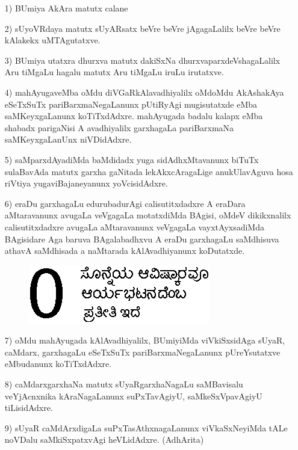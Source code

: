 \begin{itemize}
\item[{\rm 1)}] BUmiya AkAra matutx calane
  
\item[{\rm 2)}] sUyoVRdaya matutx sUyARsatx beVre beVre jAgagaLalilx beVre beVre kAlakekx uMTAgutatxve.
  
\item[{\rm 3)}] BUmiya utatxra dhurxva matutx dakiSxNa dhurxvaparxdeVshagaLalilx Aru tiMgaLu hagalu matutx Aru tiMgaLu iruLu irutatxve.

\item[{\rm 4)}] mahAyugaveMba oMdu diVGaRkAlavadhiyalilx oMdoMdu AkAshakAya eSeTxSuTx pariBarxmaNegaLanunx pUtiRyAgi mugisutatxde eMba saMKeyxgaLanunx koTiTxdAdxre. mahAyugada badalu kalapx eMba shabadx parigaNisi A avadhiyalilx garxhagaLa pariBarxmaNa saMKeyxgaLanUnx niVDidAdxre. 

\item[{\rm 5)}] saMparxdAyadiMda baMdidadx yuga sidAdhxMtavanunx biTuTx sulaBavAda matutx garxha gaNitada lekAkxcAragaLige anukUlavAguva hosa riVtiya yugaviBajaneyanunx yoVcisidAdxre. 

\item[{\rm 6)}] eraDu garxhagaLu edurubadurAgi calisutitxdadxre A eraDara aMtaravanunx avugaLa veVgagaLa motatxdiMda BAgisi, oMdeV dikikxnalilx calisutitxdadxre avugaLa aMtaravanunx veVgagaLa vayxtAyxsadiMda BAgisidare Aga baruva BAgalabadhxvu A eraDu garxhagaLu saMdhisuva athavA saMdhisada a naMtarada kAlAvadhiyanunx koDutatxde.
\begin{figure}[H]
\centering
\includegraphics[scale=0.8]{src/figures/fig17.eps}
\end{figure}
   
  
\item[{\rm 7)}] oMdu mahAyugada kAlAvadhiyalilx, BUmiyiMda viVkiSxsidAga sUyaR, caMdarx, garxhagaLu eSeTxSuTx pariBarxmaNegaLanunx pUreYsutatxve eMbudanunx koTiTxdAdxre. 

\eject

\item[{\rm 8)}] caMdarxgarxhaNa matutx sUyaRgarxhaNagaLu saMBavisalu veYjAcnxnika kAraNa\-gaLanunx suPxTavAgiyU, saMkeSxVpavAgiyU tiLisidAdxre. 
  
\item[{\rm 9)}] sUyaR caMdArxdigaLa suPxTasAthxnagaLanunx viVkaSxNeyiMda tALe noVDalu saMkiSxpatxvAgi heVLidAdxre. \hfill{(AdhArita)}
\end{itemize}
